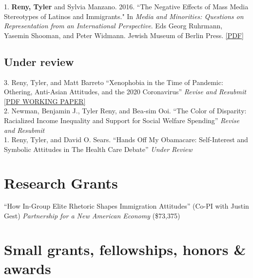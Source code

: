 \documentclass[11pt, a4paper]{article}
\newcommand{\years}[1]{\marginnote{\scriptsize #1}}
\begin{document}
\years{2016} 1. \textbf{Reny, Tyler} and Sylvia Manzano. 2016. ``The Negative Effects of Mass Media Stereotypes of Latinos and Immigrants." In \textit{Media and Minorities: Questions on Representation from an International Perspective}. Eds Georg Ruhrmann, Yasemin Shooman, and Peter Widmann. Jewish Museum of Berlin Press. \href{http://tylerreny.github.io/pdf/pubs/reny_manzano_stereotypes_2016.pdf}{[PDF]}\\

\subsection*{Under review}

\years{} 3. Reny, Tyler, and Matt Barreto ``Xenophobia in the Time of Pandemic: Othering, Anti-Asian Attitudes, and the 2020 Coronavirus'' \textit{Revise and Resubmit} \href{https://www.dropbox.com/s/3bniukgr62yu02m/Reny_Barreto_COVID_for_sharing.pdf?dl=0}{[PDF WORKING PAPER]} \\
\years{} 2. Newman, Benjamin J., Tyler Reny, and Bea-sim Ooi. ``The Color of Disparity: Racialized Income Inequality and Support for Social Welfare Spending'' \textit{Revise and Resubmit}\\
\years{} 1. Reny, Tyler, and David O. Sears. ``Hands Off My Obamacare: Self-Interest and Symbolic Attitudes in The Health Care Debate'' \textit{Under Review}\\


\section*{Research Grants}

\years{2018}``How In-Group Elite Rhetoric Shapes Immigration Attitudes'' (Co-PI with Justin Gest) \textit{Partnership for a New American Economy} (\$73,375)\\

\section*{Small grants, fellowships, honors \& awards}
\end{document}
